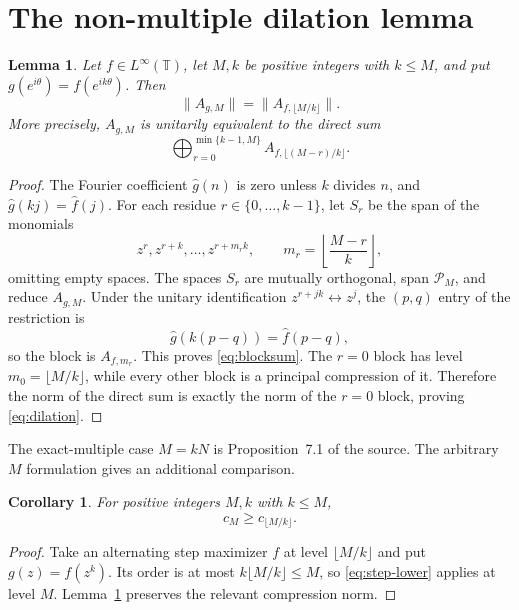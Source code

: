 \documentclass[10pt]{article}
\newtheorem{lemma}{Lemma}
\newtheorem{corollary}{Corollary}
\newcommand{\T}{\mathbb T}
\newcommand{\Pp}{\mathcal P}
\newcommand{\wh}[1]{\widehat{#1}}
\begin{document}
\section{The non-multiple dilation lemma}

\begin{lemma}\label{lem:dilation}
Let $f\in L^\infty(\T)$, let $M,k$ be positive integers with $k\le M$, and
put $g(e^{i\theta})=f(e^{ik\theta})$. Then
\begin{equation}\label{eq:dilation}
 \|A_{g,M}\|=\|A_{f,\lfloor M/k\rfloor}\|.
\end{equation}
More precisely, $A_{g,M}$ is unitarily equivalent to the direct sum
\begin{equation}\label{eq:blocksum}
 \bigoplus_{r=0}^{\min\{k-1,M\}}
 A_{f,\lfloor(M-r)/k\rfloor}.
\end{equation}
\end{lemma}

\begin{proof}
The Fourier coefficient $\wh g(n)$ is zero unless $k$ divides $n$, and
$\wh g(kj)=\wh f(j)$. For each residue $r\in\{0,\ldots,k-1\}$, let $S_r$
be the span of the monomials
\[
 z^r,z^{r+k},\ldots,z^{r+m_rk},
 \qquad m_r=\left\lfloor\frac{M-r}{k}\right\rfloor,
\]
omitting empty spaces. The spaces $S_r$ are mutually orthogonal, span
$\Pp_M$, and reduce $A_{g,M}$. Under the unitary identification
$z^{r+jk}\leftrightarrow z^j$, the $(p,q)$ entry of the restriction is
\[
 \wh g(k(p-q))=\wh f(p-q),
\]
so the block is $A_{f,m_r}$. This proves \eqref{eq:blocksum}. The $r=0$
block has level $m_0=\lfloor M/k\rfloor$, while every other block is a
principal compression of it. Therefore the norm of the direct sum is exactly
the norm of the $r=0$ block, proving \eqref{eq:dilation}.
\end{proof}

The exact-multiple case $M=kN$ is Proposition~7.1 of the source. The arbitrary
$M$ formulation gives an additional comparison.

\begin{corollary}\label{cor:comparison}
For positive integers $M,k$ with $k\le M$,
\[
 c_M\ge c_{\lfloor M/k\rfloor}.
\]
\end{corollary}

\begin{proof}
Take an alternating step maximizer $f$ at level $\lfloor M/k\rfloor$ and
put $g(z)=f(z^k)$. Its order is at most
$k\lfloor M/k\rfloor\le M$, so \eqref{eq:step-lower} applies at level $M$.
Lemma~\ref{lem:dilation} preserves the relevant compression norm.
\end{proof}
\end{document}
